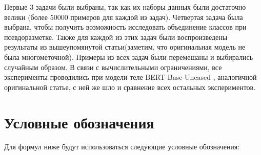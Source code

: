 Первые 3 задачи были выбраны, так как их наборы данных были достаточно велики (более 50000 примеров для каждой из задач). Четвертая задача была выбрана, чтобы получить возможность исследовать объединение классов при псевдоразметке. Также для каждой из этих задач были воспроизведены результаты из вышеупомянутой статьи(заметим, что оригинальная модель не была многометочной). Примеры из всех задач были перемешаны и выбирались случайным образом. В связи с вычислительными ограничениями, все эксперименты проводились при модели-теле BERT-Base-Uncased \cite{devlin_2018}, аналогичной оригинальной статье, с ней же шло и сравнение всех остальных экспериментов.

\section{Условные обозначения}\label{subch:pseudolabel/sect2}
   Для формул ниже будут использоваться следующие условные обозначения:
